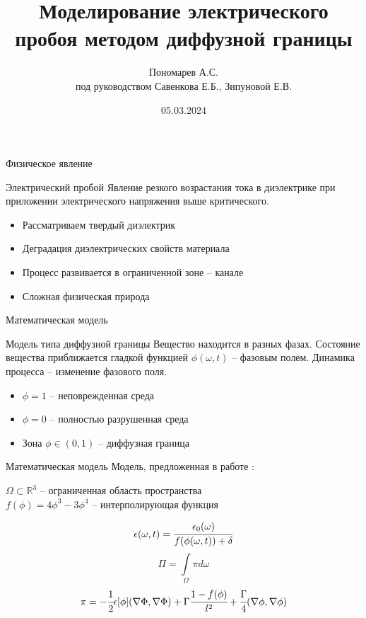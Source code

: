 \documentclass{beamer}
\title[Электрический пробой]{Моделирование электрического пробоя методом диффузной границы}
\author[]{Пономарев А.С. \\ под руководством Савенкова Е.Б., Зипуновой Е.В.}
\institute[]{группа Б05-029, 4 курс МФТИ}
\date{05.03.2024}
\begin{document}
\begin{frame}
\titlepage
\end{frame}


\begin{frame}{Физическое явление}
\begin{block}{Электрический пробой}
	Явление резкого возрастания тока в диэлектрике при приложении электрического напряжения
	выше критического.
\end{block}
\begin{itemize}
	\item Рассматриваем твердый диэлектрик
	\item Деградация диэлектрических свойств материала
	\item Процесс развивается в ограниченной зоне -- канале
	\item Сложная физическая природа
\end{itemize}
\end{frame}


\begin{frame}{Математическая модель}
\begin{block}{Модель типа диффузной границы}
	Вещество находится в разных фазах. Состояние вещества приближается гладкой функцией
	$\phi(\omega, t)$ -- фазовым полем. Динамика процесса -- изменение фазового поля.
\end{block}
\begin{itemize}
	\item $\phi = 1$ -- неповрежденная среда
	\item $\phi = 0$ -- полностью разрушенная среда
	\item Зона $\phi \in (0, 1)$ -- диффузная граница
\end{itemize}
\end{frame}


\begin{frame}{Математическая модель}
Модель, предложенная в работе \cite{kiam_model}:
\begin{center}
	$\Omega \subset \mathbb{R}^3$ -- ограниченная область пространства \\
	$f(\phi) = 4 \phi^3 - 3 \phi^4$ -- интерполирующая функция
\end{center}
$$\epsilon(\omega, t) = \cfrac{\epsilon_0(\omega)}{f(\phi(\omega, t)) + \delta}$$
$$\Pi = \int \limits_\Omega \pi d \omega$$
$$\pi = -\cfrac{1}{2} \epsilon[\phi] (\nabla \Phi, \nabla \Phi) + \Gamma \cfrac{1 -
f(\phi)}{l^2} + \cfrac{\Gamma}{4} (\nabla \phi, \nabla \phi)$$
\end{frame}
\end{document}
